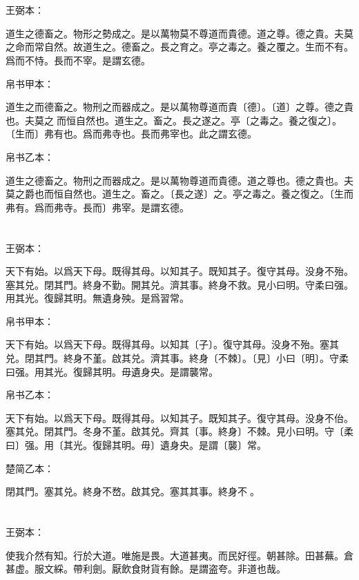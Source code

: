 \documentclass[a5paper]{ctexbook}
\begin{document}
    \chapter{}
    王弼本：

    道生之德畜之。物形之勢成之。是以萬物莫不尊道而貴德。道之尊。德之貴。夫莫之命而常自然。故道生之。德畜之。長之育之。亭之毒之。養之覆之。生而不有。爲而不恃。長而不宰。是謂玄德。

    
    帛书甲本：

    道生之而德畜之。物刑之而器成之。是以萬物尊道而貴〔德〕。〔道〕之尊。德之貴也。夫莫之𡬠而恒自然也。道生之。畜之。長之遂之。亭〔之毒之。養之復之〕。〔生而〕弗有也。爲而弗寺也。長而弗宰也。此之謂玄德。

    帛书乙本：

    道生之德畜之。物刑之而器成之。是以萬物尊道而貴德。道之尊也。德之貴也。夫莫之爵也而恒自然也。道生之。畜之。〔長之遂〕之。亭之毒之。養之復之。〔生而弗有。爲而弗寺。長而〕弗宰。是謂玄德。

    \chapter{}
    王弼本：

    天下有始。以爲天下母。既得其母。以知其子。既知其子。復守其母。没身不殆。塞其兑。閉其門。終身不勤。開其兑。濟其事。終身不救。見小曰明。守柔曰强。用其光。復歸其明。無遺身殃。是爲習常。

    
    帛书甲本：

    天下有始。以爲天下母。既得其母。以知其〔子〕。復守其母。没身不殆。塞其兑。閉其門。終身不堇。啟其兑。濟其事。終身〔不棘〕。〔見〕小曰〔明〕。守柔曰强。用其光。復歸其明。毋遺身央。是謂襲常。

    帛书乙本：

    天下有始。以爲天下母。既得其母。以知其子。既知其子。復守其母。没身不佁。塞其兑。閉其門。冬身不堇。啟其兑。齊其〔事。終身〕不棘。見小曰明。守〔柔曰〕强。用〔其光。復歸其明。毋〕遺身央。是謂〔襲〕常。

    楚简乙本：

    閉其門。塞其兑。終身不嵍。啟其兌。塞其其事。終身不󶵠。

    \chapter{}
    王弼本：

    使我介然有知。行於大道。唯施是畏。大道甚夷。而民好徑。朝甚除。田甚蕪。倉甚虚。服文綵。帶利劍。厭飲食財貨有餘。是謂盗夸。非道也哉。
\end{document}
